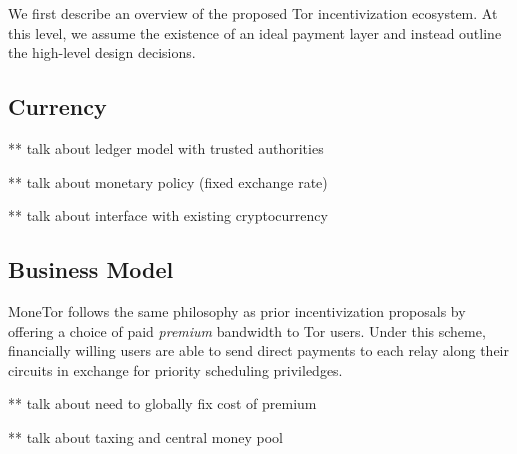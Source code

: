 We first describe an overview of the proposed Tor incentivization ecosystem. At
this level, we assume the existence of an ideal payment layer and instead
outline the high-level design decisions.

\subsection{Currency}

** talk about ledger model with trusted authorities

** talk about monetary policy (fixed exchange rate)

** talk about interface with existing cryptocurrency

\subsection{Business Model}

MoneTor follows the same philosophy as prior incentivization proposals by
offering a choice of paid \emph{premium} bandwidth to Tor users. Under this
scheme, financially willing users are able to send direct payments to each relay
along their circuits in exchange for priority scheduling priviledges.

** talk about need to globally fix cost of premium

** talk about taxing and central money pool